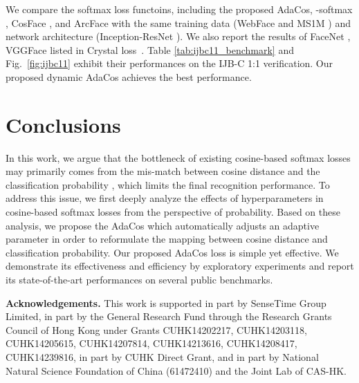 \documentclass[10pt,twocolumn,letterpaper]{article}
\begin{document}
We compare the softmax loss functoins, including the proposed AdaCos, -softmax \cite{L2-softmax}, CosFace \cite{CosFace}, and ArcFace \cite{ArcFace} with the same training data (WebFace \cite{WebFace} and MS1M \cite{MS-Celeb-1M}) and network architecture (Inception-ResNet \cite{IR}). We also report the results of FaceNet \cite{FaceNet}, VGGFace \cite{DeepFace} listed in Crystal loss~\cite{ranjan2018crystal}. Table \ref{tab:ijbc11_benchmark} and Fig.~\ref{fig:ijbc11} exhibit their performances on the IJB-C 1:1 verification. Our proposed dynamic AdaCos achieves the best performance.


\section{Conclusions}
In this work, we argue that the bottleneck of existing cosine-based softmax losses may primarily comes from the mis-match between cosine distance  and the classification probability , which limits the final recognition performance. To address this issue, we first deeply analyze the effects of hyperparameters in cosine-based softmax losses from the perspective of probability. Based on these analysis, we propose the AdaCos which automatically adjusts an adaptive parameter  in order to reformulate the mapping between cosine distance and classification probability. Our proposed AdaCos loss is simple yet effective. We demonstrate its effectiveness and efficiency by exploratory experiments and report its state-of-the-art performances on several public benchmarks.

\textbf{Acknowledgements.} This work is supported in part by SenseTime Group Limited, in part by the General Research Fund through the Research Grants Council of Hong Kong under Grants CUHK14202217, CUHK14203118, CUHK14205615, CUHK14207814, CUHK14213616, CUHK14208417, CUHK14239816, in part by CUHK Direct Grant, and in part by National Natural Science Foundation of China (61472410) and the Joint Lab of CAS-HK.


{\small


}
\end{document}
